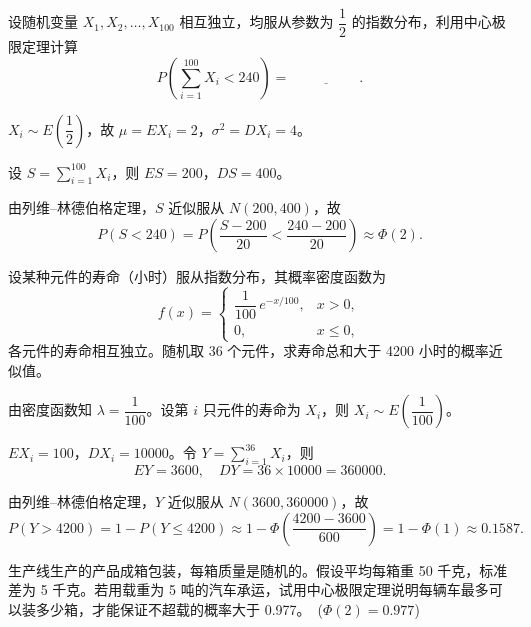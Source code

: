 \documentclass[lang=cn,11pt]{elegantbook}
\begin{document}
\begin{exercise}\label{exer:5-clt-exp100}
设随机变量 \(X_1, X_2, \dots, X_{100}\) 相互独立，均服从参数为 \(\dfrac{1}{2}\) 的指数分布，利用中心极限定理计算
\[
P\!\left(\sum_{i=1}^{100} X_i < 240\right) =\,\underline{\hspace{2cm}}.
\]
\end{exercise}

\begin{solution}
\(X_i \sim E\!\left(\dfrac{1}{2}\right)\)，故 \(\mu = EX_i = 2\)，\(\sigma^2 = DX_i = 4\)。

设 \(S = \displaystyle\sum_{i=1}^{100} X_i\)，则 \(ES = 200\)，\(DS = 400\)。

由列维--林德伯格定理，\(S\) 近似服从 \(N(200, 400)\)，故
\[
P(S < 240) = P\!\left(\frac{S - 200}{20} < \frac{240 - 200}{20}\right) \approx \Phi(2).
\]
\end{solution}

\begin{exercise}\label{exer:5-clt-exp36}
设某种元件的寿命（小时）服从指数分布，其概率密度函数为
\[
f(x) = \begin{cases} \dfrac{1}{100}\,e^{-x/100}, & x > 0, \\[4pt] 0, & x \leq 0, \end{cases}
\]
各元件的寿命相互独立。随机取 36 个元件，求寿命总和大于 4200 小时的概率近似值。
\end{exercise}

\begin{solution}
由密度函数知 \(\lambda = \dfrac{1}{100}\)。设第 \(i\) 只元件的寿命为 \(X_i\)，则 \(X_i \sim E\!\left(\dfrac{1}{100}\right)\)。

\(EX_i = 100\)，\(DX_i = 10000\)。令 \(Y = \displaystyle\sum_{i=1}^{36} X_i\)，则
\[
EY = 3600,\quad DY = 36 \times 10000 = 360000.
\]

由列维--林德伯格定理，\(Y\) 近似服从 \(N(3600, 360000)\)，故
\[
P(Y > 4200) = 1 - P(Y \leq 4200) \approx 1 - \Phi\!\left(\frac{4200 - 3600}{600}\right) = 1 - \Phi(1) \approx 0.1587.
\]
\end{solution}

\begin{exercise}\label{exer:5-clt-box}
生产线生产的产品成箱包装，每箱质量是随机的。假设平均每箱重 50 千克，标准差为 5 千克。若用载重为 5 吨的汽车承运，试用中心极限定理说明每辆车最多可以装多少箱，才能保证不超载的概率大于 0.977。\ (\(\Phi(2) = 0.977\))
\end{exercise}
\end{document}
